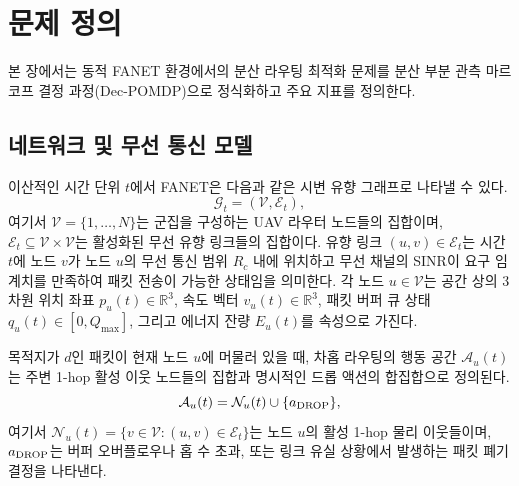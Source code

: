 \section{문제 정의}
\label{sec:문제정의}

본 장에서는 동적 FANET 환경에서의 분산 라우팅 최적화 문제를 분산 부분 관측 마르코프 결정 과정(Dec-POMDP)으로 정식화하고 주요 지표를 정의한다.

\subsection{네트워크 및 무선 통신 모델}
이산적인 시간 단위 $t$에서 FANET은 다음과 같은 시변 유향 그래프로 나타낼 수 있다.
\begin{equation}
    \mathcal{G}_t = (\mathcal{V}, \mathcal{E}_t),
\end{equation}
여기서 $\mathcal{V}=\{1,\ldots,N\}$는 군집을 구성하는 UAV 라우터 노드들의 집합이며, $\mathcal{E}_t \subseteq \mathcal{V} \times \mathcal{V}$는 활성화된 무선 유향 링크들의 집합이다. 유향 링크 $(u, v) \in \mathcal{E}_t$는 시간 $t$에 노드 $v$가 노드 $u$의 무선 통신 범위 $R_c$ 내에 위치하고 무선 채널의 SINR이 요구 임계치를 만족하여 패킷 전송이 가능한 상태임을 의미한다. 각 노드 $u \in \mathcal{V}$는 공간 상의 3차원 위치 좌표 $p_u(t) \in \mathbb{R}^3$, 속도 벡터 $v_u(t) \in \mathbb{R}^3$, 패킷 버퍼 큐 상태 $q_u(t) \in [0, Q_{\max}]$, 그리고 에너지 잔량 $E_u(t)$를 속성으로 가진다.

목적지가 $d$인 패킷이 현재 노드 $u$에 머물러 있을 때, 차홉 라우팅의 행동 공간 $\mathcal{A}_u(t)$는 주변 1-hop 활성 이웃 노드들의 집합과 명시적인 드롭 액션의 합집합으로 정의된다.
\begin{equation}
    \mathcal{A}_u(t) = \mathcal{N}_u(t) \cup \{a_{\mathrm{DROP}}\},
\end{equation}
여기서 $\mathcal{N}_u(t) = \{v \in \mathcal{V} : (u, v) \in \mathcal{E}_t\}$는 노드 $u$의 활성 1-hop 물리 이웃들이며, $a_{\mathrm{DROP}}$는 버퍼 오버플로우나 홉 수 초과, 또는 링크 유실 상황에서 발생하는 패킷 폐기 결정을 나타낸다.

